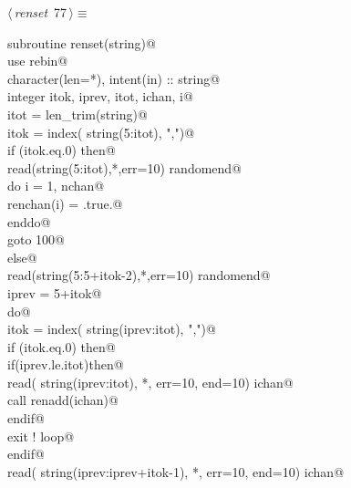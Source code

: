 \documentclass[10pt,a4paper,notitlepage]{article}
\begin{document}
\begin{flushleft} \small
\begin{minipage}{\linewidth}\label{scrap86}\raggedright\small
{} $\langle\,${\it renset}\nobreak\ {\footnotesize {77}}$\,\rangle\equiv$
\vspace{-1ex}
\begin{list}{}{} \item
\mbox{}\verb@      subroutine renset(string)@\\
\mbox{}\verb@      use rebin@\\
\mbox{}\verb@      character(len=*), intent(in) :: string@\\
\mbox{}\verb@      integer itok, iprev, itot, ichan, i@\\
\mbox{}\verb@      itot = len_trim(string)@\\
\mbox{}\verb@      itok = index( string(5:itot), ",")@\\
\mbox{}\verb@      if (itok.eq.0) then@\\
\mbox{}\verb@         read(string(5:itot),*,err=10) randomend@\\
\mbox{}\verb@         do i = 1, nchan@\\
\mbox{}\verb@           renchan(i) = .true.@\\
\mbox{}\verb@         enddo@\\
\mbox{}\verb@         goto 100@\\
\mbox{}\verb@      else@\\
\mbox{}\verb@         read(string(5:5+itok-2),*,err=10) randomend@\\
\mbox{}\verb@         iprev = 5+itok@\\
\mbox{}\verb@         do@\\
\mbox{}\verb@            itok = index( string(iprev:itot), ",")@\\
\mbox{}\verb@            if (itok.eq.0) then@\\
\mbox{}\verb@               if(iprev.le.itot)then@\\
\mbox{}\verb@                  read( string(iprev:itot), *, err=10, end=10) ichan@\\
\mbox{}\verb@                  call renadd(ichan)@\\
\mbox{}\verb@               endif@\\
\mbox{}\verb@               exit ! loop@\\
\mbox{}\verb@            endif@\\
\mbox{}\verb@            read( string(iprev:iprev+itok-1), *, err=10, end=10) ichan@\\

\end{list}
\end{minipage}
\end{flushleft}
\end{document}
